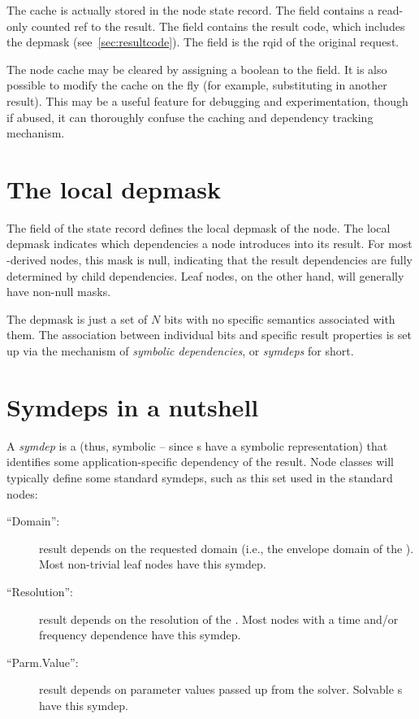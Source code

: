   The cache is actually stored in the node state record. The 
  field contains a read-only counted ref to the result. The
   field contains the result code, which includes the
  depmask (see~\ref{sec:resultcode}). The  field is the rqid of
  the original request.

  The node cache may be cleared by assigning a boolean  to the
   field. It is also possible to modify the cache on the fly
  (for example, substituting in another result). This may be a useful feature
  for debugging and experimentation, though if abused, it can thoroughly
  confuse the caching and dependency tracking mechanism.  

\section{The local depmask}
  
  The  field of the state record defines the local depmask of
  the node. The local depmask indicates which dependencies a node introduces
  into its result. For most -derived nodes, this mask is null,
  indicating that the result dependencies are fully determined by child
  dependencies. Leaf nodes, on the other hand, will generally have non-null
  masks.

  The depmask is just a set of $N$ bits with no specific semantics associated
  with them. The association between individual bits and specific result
  properties is set up via the mechanism of {\em symbolic dependencies}, or
  {\em symdeps} for short.

\section{Symdeps in a nutshell}
  
  A {\em symdep} is a  (thus, symbolic -- since s have a
  symbolic representation) that identifies some application-specific dependency
  of the result. Node classes will typically define some standard symdeps, such
  as this set used in the standard nodes:

  \begin{description}
  
  \item[``Domain'':] result depends on the requested domain (i.e., the envelope
    domain of the \Cells). Most non-trivial leaf nodes have this symdep.

  \item[``Resolution'':] result depends on the resolution of the \Cells. Most
    nodes with a time and/or frequency dependence have this symdep.
   
  \item[``Parm.Value'':] result depends on parameter values passed up from the
    solver. Solvable \Parm{}s have this symdep.
  
  \end{description}
  
